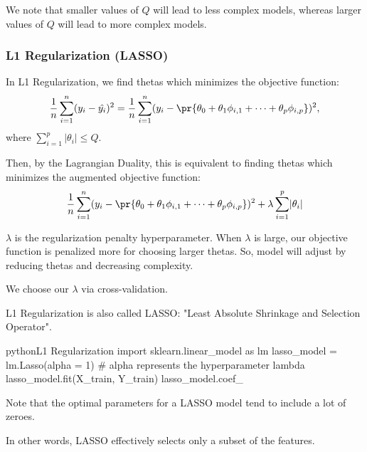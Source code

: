 \documentclass[openany]{book}
\begin{document}
We note that smaller values of $Q$ will lead to less complex models, whereas larger values of $Q$ will lead to more complex models.

\subsubsection{L1 Regularization (LASSO)}
\begin{defn}[L1 Regularization]
	In L1 Regularization, we find thetas which minimizes the objective function:
	\begin{equation*}
		\dfrac{1}{n} \sum_{i=1}^{n} (y_i - \hat{y_i})^{2} = \dfrac{1}{n} \sum_{i=1}^{n} (y_i - \pr{\theta_0 + \theta_1\phi_{i,1} + \cdots + \theta_p\phi_{i,p}})^{2},
	\end{equation*}
	where $\sum_{i=1}^{p} \lvert \theta_i \rvert \leq Q$.
	
	Then, by the Lagrangian Duality, this is equivalent to finding thetas which minimizes the augmented objective function:
	\begin{equation*}
		\dfrac{1}{n} \sum_{i=1}^{n} (y_i - \pr{\theta_0 + \theta_1\phi_{i,1} + \cdots + \theta_p\phi_{i,p}})^{2} + \lambda\sum_{i=1}^{p} \lvert \theta_i \rvert
	\end{equation*}
\end{defn}
\begin{defn}
	$\lambda$ is the regularization penalty hyperparameter. When $\lambda$ is large, our objective function is penalized more for choosing larger thetas. So, model will adjust by reducing thetas and decreasing complexity.
\end{defn}

We choose our $\lambda$ via cross-validation.

\begin{rmk}
	L1 Regularization is also called LASSO: "Least Absolute Shrinkage and Selection Operator".
\end{rmk}

\begin{code}{python}{L1 Regularization}
import sklearn.linear_model as lm
lasso_model = lm.Lasso(alpha = 1) # alpha represents the hyperparameter lambda
lasso_model.fit(X_train, Y_train)
lasso_model.coef_
\end{code}

Note that the optimal parameters for a LASSO model tend to include a lot of zeroes.

In other words, LASSO effectively selects only a subset of the features.
\end{document}
